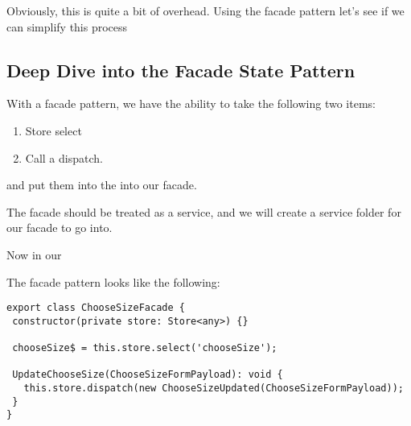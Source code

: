 Obviously, this is quite a bit of overhead. Using the facade pattern let's see
if we can simplify this process

\subsection{ Deep Dive into the Facade State Pattern  }

With a facade pattern, we have the ability to take the following two items:
\begin{enumerate}
  \item Store select
  \item Call a dispatch.
\end{enumerate}

and put them into the into our facade.

The facade should be treated as a service, and we will create a service folder
for our facade to go into.

Now in our

The facade pattern looks like the following:
\begin{lstlisting}
export class ChooseSizeFacade {
 constructor(private store: Store<any>) {}

 chooseSize$ = this.store.select('chooseSize');

 UpdateChooseSize(ChooseSizeFormPayload): void {
   this.store.dispatch(new ChooseSizeUpdated(ChooseSizeFormPayload));
 }
}
\end{lstlisting}
